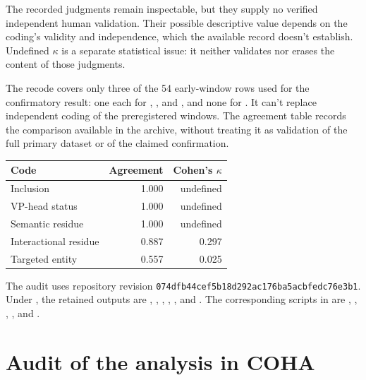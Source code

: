 \documentclass[12pt]{article}
\begin{document}
The recorded judgments remain inspectable, but they supply no verified
independent human validation. Their possible descriptive value depends
on the coding's validity and independence, which the available record
doesn't establish. Undefined $\kappa$ is a separate statistical issue:
it neither validates nor erases the content of those judgments.

The recode covers only three of the 54 early-window rows used for the
confirmatory result: one each for , , and
, and none for . It can't replace
independent coding of the preregistered windows. The agreement table
records the comparison available in the archive, without treating it
as validation of the full primary dataset or of the claimed confirmation.


\begin{center}
\begin{tabular}{lrr}
  \toprule
  Code & Agreement & Cohen's $\kappa$ \\
  \midrule
  Inclusion & 1.000 & undefined \\
  VP-head status & 1.000 & undefined \\
  Semantic residue & 1.000 & undefined \\
  Interactional residue & 0.887 & 0.297 \\
  Targeted entity & 0.557 & 0.025 \\
  \bottomrule
\end{tabular}
\end{center}

\begingroup
\small
The audit uses repository revision \texttt{074dfb44cef5b18d292ac176ba5acbfedc76e3b1}. Under , the retained outputs are , , , , , and . The corresponding scripts in  are , , , , and .
\par
\endgroup

\clearpage

\section[Fie in COHA]{Audit of the  analysis in COHA}
\label{app:fie}
\end{document}
